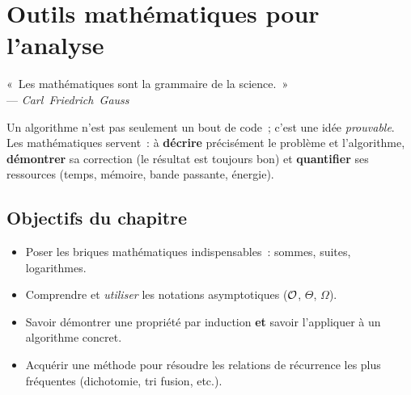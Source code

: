 
\chapter{Outils mathématiques pour l’analyse}

\begin{flushright}\small
« Les mathématiques sont la grammaire de la science. »\\[-0.2em]
— \textit{Carl Friedrich Gauss}
\end{flushright}

Un algorithme n’est pas seulement un bout de code ; c’est une idée
\emph{prouvable}. Les mathématiques servent : à \textbf{décrire} précisément le problème et l’algorithme, \textbf{démontrer} sa correction (le résultat est toujours bon) et \textbf{quantifier} ses ressources (temps, mémoire, bande passante, énergie).


\section*{Objectifs du chapitre}
\begin{itemize}[label=\small$\blacktriangleright$]
  \item Poser les briques mathématiques indispensables : sommes, suites,
        logarithmes.
  \item Comprendre et \emph{utiliser} les notations asymptotiques
        ($\mathcal{O}$, $\Theta$, $\Omega$).
  \item Savoir démontrer une propriété par induction \textbf{et} savoir
        l’appliquer à un algorithme concret.
  \item Acquérir une méthode pour résoudre les relations de récurrence
        les plus fréquentes (dichotomie, tri fusion, etc.).
\end{itemize}
\vspace{0.8em}

